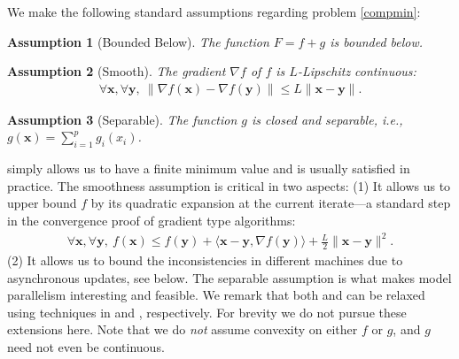 \documentclass[leqno,onefignum,onetabnum]{siamart0516}
\newtheorem{assum}{Assumption}
\newcommand{\ie}{{i.e.}\xspace}
\newcommand{\xb}{\mathbf{x}}
\newcommand{\yb}{\mathbf{y}}
\begin{document}
We make the following standard assumptions regarding problem \eqref{compmin}:
\begin{assum}[Bounded Below]
	\label{assum:bb}
The function $F \!=\! f+g$ is bounded below.
\end{assum}
\begin{assum}[Smooth]
	\label{assum:smooth}
	The gradient $\nabla f$ of $f$ is $L$-Lipschitz continuous:
	\begin{align}
	\forall \xb, \forall \yb, ~ \| \nabla f(\xb) - \nabla f(\yb) \| \leq L \|\xb - \yb\|.
	\end{align}
\end{assum}
\begin{assum}[Separable]
	\label{assum:separable}
	The function $g$ is closed and separable, \ie, $g(\xb) = \sum_{i=1}^{p} g_i(x_i)$.
\end{assum}

 simply allows us to have a finite minimum value and is usually satisfied in practice.
The smoothness assumption is critical in two aspects: (1) It allows us to upper bound $f$ by its quadratic expansion at the current iterate---a standard step in the convergence proof of gradient type algorithms:
\begin{align}
\label{eq:qb}
\forall \xb, \forall \yb, ~f(\xb) \leq f(\yb) + \langle \xb - \yb, \nabla f(\yb) \rangle + \tfrac{L}{2} \|\xb - \yb\|^2.
\end{align}
 (2) It allows us to bound the inconsistencies in different machines due to asynchronous updates, see  below. 
The separable assumption is what makes model parallelism interesting and feasible. We remark that both  and  can be relaxed using techniques in \cite{smoothing} and \cite{YuZMX15}, respectively. For brevity we do not pursue these extensions here.
Note that we do \emph{not} assume convexity on either $f$ or $g$, and $g$ need not even be continuous.
\end{document}
